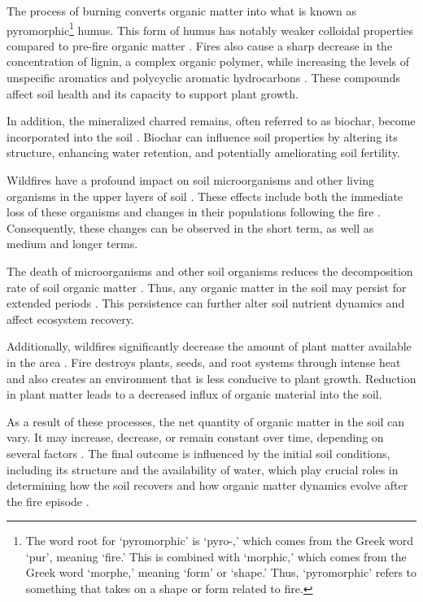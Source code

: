\documentclass[
  12 pt,
]{Nemilov}
\begin{document}
The process of burning converts organic matter into what is known as pyromorphic\footnote{The word root for `pyromorphic' is `pyro-,' which comes from the Greek word `pur', meaning `fire.' This is combined with `morphic,' which comes from the Greek word `morphe,' meaning `form' or `shape.' Thus, `pyromorphic' refers to something that takes on a shape or form related to fire.} humus. This form of humus has notably weaker colloidal properties compared to pre-fire organic matter \citep{gonzalez2004effect}. Fires also cause a sharp decrease in the concentration of lignin, a complex organic polymer, while increasing the levels of unspecific aromatics and polycyclic aromatic hydrocarbons \citep{jimenez2020effect, merino2018inferring}. These compounds affect soil health and its capacity to support plant growth.

In addition, the mineralized charred remains, often referred to as biochar, become incorporated into the soil \citep{fernandez1997organic, knicker2007does}. Biochar can influence soil properties by altering its structure, enhancing water retention, and potentially ameliorating soil fertility.

Wildfires have a profound impact on soil microorganisms and other living organisms in the upper layers of soil \citep{borgogni2019immediate, koster2021impacts}. These effects include both the immediate loss of these organisms and changes in their populations following the fire \citep{acea1996changes, ginzburg2012effects, rodriguez2017wildfire}. Consequently, these changes can be observed in the short term, as well as medium and longer terms.

The death of microorganisms and other soil organisms reduces the decomposition rate of soil organic matter \citep{visser1999wildfire}. Thus, any organic matter in the soil may persist for extended periods \citep{holden2013changes}. This persistence can further alter soil nutrient dynamics and affect ecosystem recovery.

Additionally, wildfires significantly decrease the amount of plant matter available in the area \citep{bartels2016trends, cuevas2009analysing}. Fire destroys plants, seeds, and root systems through intense heat and also creates an environment that is less conducive to plant growth. Reduction in plant matter leads to a decreased influx of organic material into the soil.

As a result of these processes, the net quantity of organic matter in the soil can vary. It may increase, decrease, or remain constant over time, depending on several factors \citep{kelly2021boreal, pellegrini2022fire}. The final outcome is influenced by the initial soil conditions, including its structure and the availability of water, which play crucial roles in determining how the soil recovers and how organic matter dynamics evolve after the fire episode \citep{aedo2021numerical}.
\end{document}
